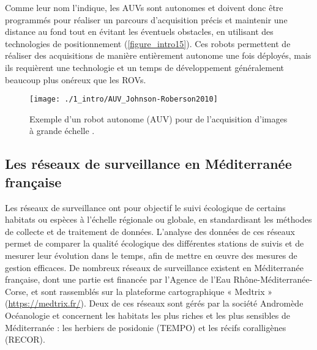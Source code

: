Comme leur nom l’indique, les AUVs sont autonomes et doivent donc être programmés pour réaliser un parcours d’acquisition précis et maintenir une distance au fond tout en évitant les éventuels obstacles, en utilisant des technologies de positionnement \citep{johnson-roberson_generation_2010, bonin-font_towards_2016} (\autoref{figure_intro15}). Ces robots permettent de réaliser des acquisitions de manière entièrement autonome une fois déployés, mais ils requièrent une technologie et un temps de développement généralement beaucoup plus onéreux que les ROVs.

\begin{figure}[H]
	\begin{center}
	\texttt{[image: ./1\_intro/AUV\_Johnson-Roberson2010]}
		\caption[Exemple d’un robot autonome (AUV) pour de l’acquisition d’images à grande échelle]{Exemple d’un robot autonome (AUV) pour de l’acquisition d’images à grande échelle \citep{johnson-roberson_generation_2010}.}
	\label{figure_intro15}
\end{center}
\end{figure}

\setlength{\fboxsep}{5pt}
\setlength{\fboxrule}{0.6pt}
\noindent{}

\subsection{Les réseaux de surveillance en Méditerranée française}\label{intro.2.3}

Les réseaux de surveillance ont pour objectif le suivi écologique de certains habitats ou espèces à l’échelle régionale ou globale, en standardisant les méthodes de collecte et de traitement de données. L’analyse des données de ces réseaux permet de comparer la qualité écologique des différentes stations de suivis et de mesurer leur évolution dans le temps, afin de mettre en œuvre des mesures de gestion efficaces. De nombreux réseaux de surveillance existent en Méditerranée française, dont une partie est financée par l’Agence de l’Eau Rhône-Méditerranée-Corse, et sont rassemblés sur la plateforme cartographique « Medtrix » (\href{https://medtrix.fr/}{https://medtrix.fr/}). Deux de ces réseaux sont gérés par la société Andromède Océanologie et concernent les habitats les plus riches et les plus sensibles de Méditerranée : les herbiers de posidonie (TEMPO) et les récifs coralligènes (RECOR).

